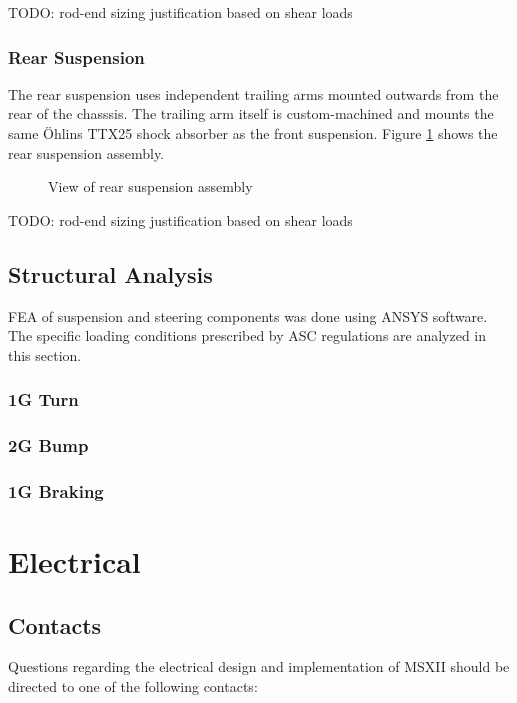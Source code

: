 \documentclass[10pt]{article}
\begin{document}
TODO: rod-end sizing justification based on shear loads

\subsubsection{Rear Suspension}
The rear suspension uses independent trailing arms mounted outwards from the rear of the chasssis. The trailing arm itself is custom-machined and mounts the same \"Ohlins TTX25 shock absorber as the front suspension. Figure \ref{fig:rear-suspension} shows the rear suspension assembly.

\begin{figure}
\centering
\caption{View of rear suspension assembly}
\label{fig:rear-suspension}
\end{figure}

TODO: rod-end sizing justification based on shear loads

\subsection{Structural Analysis}
FEA of suspension and steering components was done using ANSYS software. The specific loading conditions prescribed by ASC regulations are analyzed in this section.

\subsubsection{1G Turn}

\subsubsection{2G Bump}

\subsubsection{1G Braking}

\clearpage
\section{Electrical}

\subsection{Contacts}
Questions regarding the electrical design and implementation of MSXII should be directed to one of the following contacts:
\end{document}
